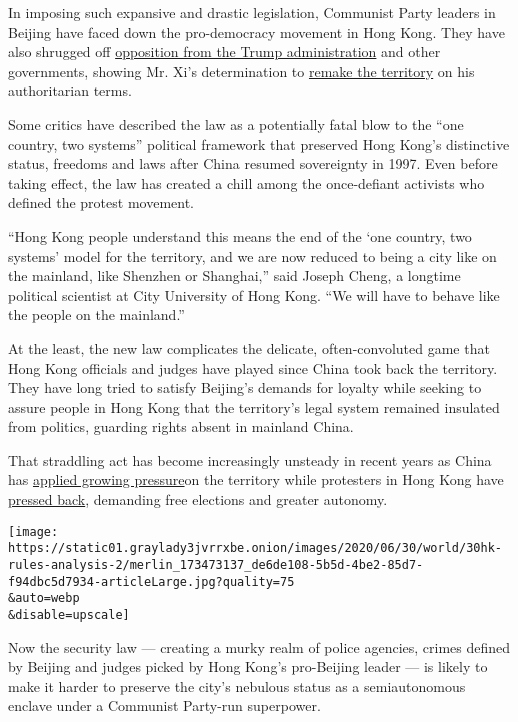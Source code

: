 In imposing such expansive and drastic legislation, Communist Party
leaders in Beijing have faced down the pro-democracy movement in Hong
Kong. They have also shrugged off
\href{https://www.nytimes3xbfgragh.onion/2020/05/27/us/politics/china-hong-kong-pompeo-trade.html}{opposition
from the Trump administration} and other governments, showing Mr. Xi's
determination to
\href{https://www.nytimes3xbfgragh.onion/2019/10/31/world/asia/hong-kong-protests-china.html}{remake
the territory} on his authoritarian terms.

Some critics have described the law as a potentially fatal blow to the
``one country, two systems'' political framework that preserved Hong
Kong's distinctive status, freedoms and laws after China resumed
sovereignty in 1997. Even before taking effect, the law has created a
chill among the once-defiant activists who defined the protest movement.

``Hong Kong people understand this means the end of the `one country,
two systems' model for the territory, and we are now reduced to being a
city like on the mainland, like Shenzhen or Shanghai,'' said Joseph
Cheng, a longtime political scientist at City University of Hong Kong.
``We will have to behave like the people on the mainland.''

At the least, the new law complicates the delicate, often-convoluted
game that Hong Kong officials and judges have played since China took
back the territory. They have long tried to satisfy Beijing's demands
for loyalty while seeking to assure people in Hong Kong that the
territory's legal system remained insulated from politics, guarding
rights absent in mainland China.

That straddling act has become increasingly unsteady in recent years as
China has
\href{https://www.nytimes3xbfgragh.onion/2014/09/01/world/asia/hong-kong-elections.html}{applied
growing pressure}on the territory while protesters in Hong Kong have
\href{https://www.nytimes3xbfgragh.onion/2014/09/29/world/asia/clashes-in-hong-kong.html}{pressed
back}, demanding free elections and greater autonomy.

\texttt{[image: https://static01.graylady3jvrrxbe.onion/images/2020/06/30/world/30hk-rules-analysis-2/merlin\_173473137\_de6de108-5b5d-4be2-85d7-f94dbc5d7934-articleLarge.jpg?quality=75\\\&auto=webp\\\&disable=upscale]}

Now the security law --- creating a murky realm of police agencies,
crimes defined by Beijing and judges picked by Hong Kong's pro-Beijing
leader --- is likely to make it harder to preserve the city's nebulous
status as a semiautonomous enclave under a Communist Party-run
superpower.

